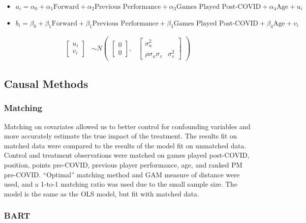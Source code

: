 \documentclass[12pt]{article}
\begin{document}
\begin{itemize}
\item
  \(a_i = \alpha_0 + \alpha_1\text{Forward} + \alpha_2\text{Previous Performance} + \alpha_3\text{Games Played Post-COVID} + \alpha_4\text{Age} + u_i\)
\item
  \(b_i = \beta_0 + \beta_1\text{Forward} + \beta_1\text{Previous Performance} + \beta_3\text{Games Played Post-COVID} + \beta_4\text{Age} + v_i\)
\end{itemize}

\begin{align*}
\begin{bmatrix}u_{i}\\
v_{i}
\end{bmatrix} &\sim  N
\begin{pmatrix}
\begin{bmatrix}
0\\
0
\end{bmatrix}\!\!,&
\begin{bmatrix}
\sigma_{u}^2 & \\
\rho\sigma_{u}\sigma_{v} & \sigma_{v}^2
\end{bmatrix}
\end{pmatrix}
\end{align*}

\hypertarget{causal-methods}{%
\subsection{Causal Methods}\label{causal-methods}}

\hypertarget{matching}{%
\subsubsection{Matching}\label{matching}}

Matching on covariates allowed us to better control for confounding
variables and more accurately estimate the true impact of the treatment.
The results fit on matched data were compared to the results of the
model fit on unmatched data. Control and treatment observations were
matched on games played post-COVID, position, points pre-COVID, previous
player performance, age, and ranked PM pre-COVID. ``Optimal'' matching
method and GAM measure of distance were used, and a 1-to-1 matching
ratio was used due to the small sample size. The model is the same as
the OLS model, but fit with matched data.

\hypertarget{bart}{%
\subsubsection{BART}\label{bart}}
\end{document}
